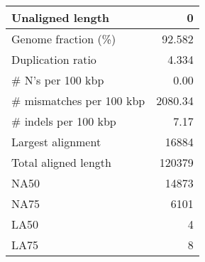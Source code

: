 \documentclass[12pt,a4paper]{article}
\begin{document}
\begin{table}[ht]
\begin{center}
\begin{tabular}{|l*{1}{|r}|}
Unaligned length & 0 \\ \hline
Genome fraction (\%) & 92.582 \\ \hline
Duplication ratio & 4.334 \\ \hline
\# N's per 100 kbp & 0.00 \\ \hline
\# mismatches per 100 kbp & 2080.34 \\ \hline
\# indels per 100 kbp & 7.17 \\ \hline
Largest alignment & 16884 \\ \hline
Total aligned length & 120379 \\ \hline
NA50 & 14873 \\ \hline
NA75 & 6101 \\ \hline
LA50 & 4 \\ \hline
LA75 & 8 \\ \hline
\end{tabular}
\end{center}
\end{table}
\end{document}
